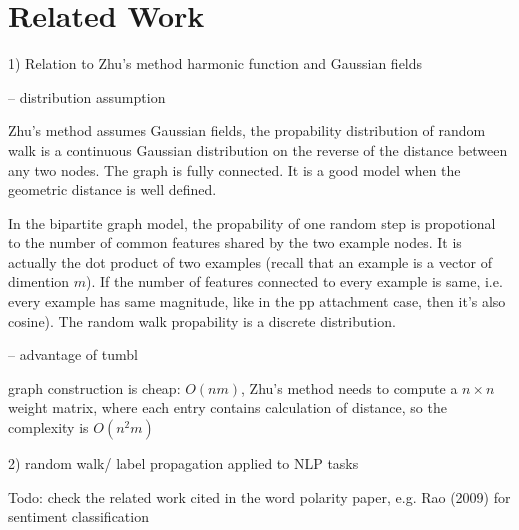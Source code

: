 \section{Related Work}

1) Relation to Zhu's method harmonic function and Gaussian fields

-- distribution assumption

Zhu's method assumes Gaussian fields, the propability distribution of random
walk is a continuous Gaussian distribution on the reverse of the distance
between any two nodes. The graph is fully connected. 
It is a good model when the geometric distance is well defined.

In the bipartite graph model, the propability of one random step is propotional to the number of
common features shared by the two example nodes. It is actually the dot product
of two examples (recall that an example is a vector of dimention $m$).
If the number of features connected to every example 
is same, i.e. every example has same magnitude, like in the pp attachment case,
then it's also cosine). The random walk propability is a discrete distribution.

-- advantage of tumbl

graph construction is cheap: $O(nm)$, Zhu's method needs
to compute a $n \times n$ weight matrix, where each entry contains calculation
of distance, so the complexity is $O(n^2m)$

2) random walk/ label propagation applied to NLP tasks

Todo: check the related work cited in the word polarity paper, 
 e.g. Rao (2009) for sentiment classification


